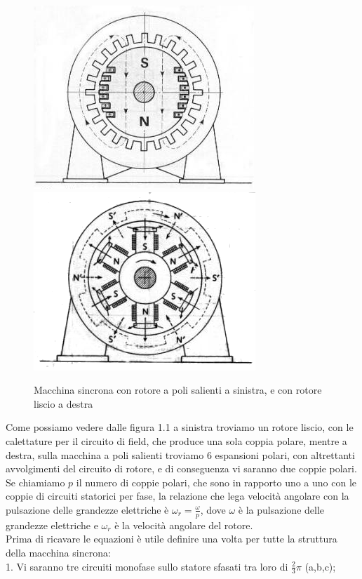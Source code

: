 \documentclass[Lau,noexaminfo]{sapthesis}
\begin{document}
	\begin{figure}
		\centering
		\includegraphics[scale=0.55]{poli_lisci1}
		\includegraphics[scale=0.55]{poli_salienti1}
		\caption{Macchina sincrona con rotore a poli salienti a sinistra, e con rotore liscio a destra}
	\end{figure}
	Come possiamo vedere dalle figura 1.1 a sinistra troviamo un rotore liscio, con le calettature per il circuito di field, che produce una sola coppia polare, mentre a destra, sulla macchina a poli salienti troviamo 6 espansioni polari, con altrettanti avvolgimenti del circuito di rotore, e di conseguenza vi saranno due coppie polari. Se chiamiamo $p$ il numero di coppie polari, che sono in rapporto uno a uno con le coppie di circuiti statorici per fase, la relazione che lega velocità angolare con la pulsazione delle grandezze elettriche è $\omega_r = \frac{\omega}{p}$, dove $\omega$ è la pulsazione delle grandezze elettriche e $\omega_r$ è la velocità angolare del rotore.\\
	Prima di ricavare le equazioni è utile definire una volta per tutte la struttura della macchina sincrona:\\
	1. Vi saranno tre circuiti monofase sullo statore sfasati tra loro di $\frac{2}{3}\pi$ (a,b,c);\\
\end{document}
